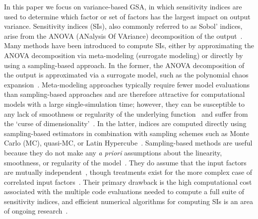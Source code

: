 In this paper we focus on variance-based GSA, in which sensitivity indices are used to determine which factor or set of factors has the largest impact on output variance. 
Sensitivity indices (SIs), also commonly referred to as Sobol' indices, arise from the ANOVA (ANalysis Of VAriance) decomposition of the output~\cite{sobol-1993, homma-saltelli-1996}. 
Many methods have been introduced to compute SIs, either by approximating the ANOVA decomposition via meta-modeling (surrogate modeling) or directly by using a sampling-based approach.
In the former, the ANOVA decomposition of the output is approximated via a surrogate model, such as the polynomial chaos expansion~\cite{crestaux-lemaitre-2009}. 
Meta-modeling approaches typically require fewer model evaluations than sampling-based approaches and are therefore attractive for computational models with a large single-simulation time; however, they can be susceptible to any lack of smoothness or regularity of the underlying function~\cite{saltelli-etal-2008, crestaux-lemaitre-2009} and suffer from the `curse of dimensionality'~\cite{kontolati-etal-2022, crestaux-lemaitre-2009}. 
In the latter, indices are computed directly using sampling-based estimators in combination with sampling schemes such as Monte Carlo (MC), quasi-MC, or Latin Hypercube~\cite{sobol-1993, homma-saltelli-1996, kucherenko-etal-2015}.
Sampling-based methods are useful because they do not make any \textit{a priori} assumptions about the linearity, smoothness, or regularity of the model~\cite{archer-etal-1997, cacuci-ionescu-2004}. 
They do assume that the input factors are mutually independent~\cite{saltelli-2002}, though treatments exist for the more complex case of correlated input factors~\cite{saltelli-etal-2008}. 
Their primary drawback is the high computational cost associated with the multiple code evaluations needed to compute a full suite of sensitivity indices, and efficient numerical algorithms for computing SIs is an area of ongoing research~\cite{puy-etal-2022}.

